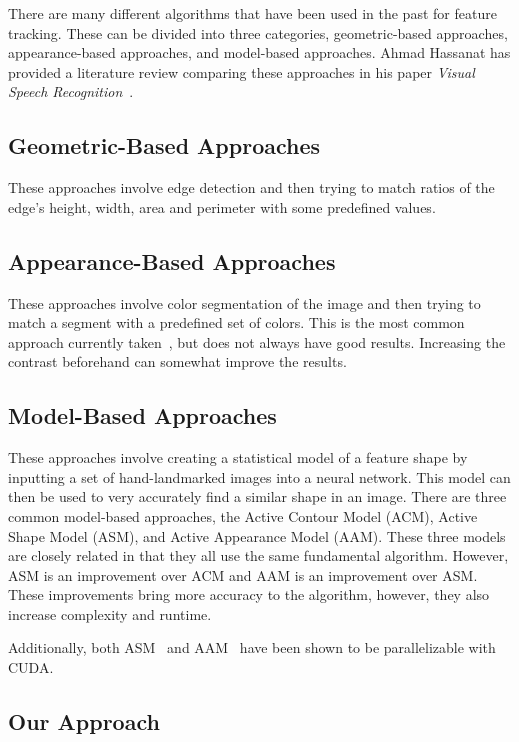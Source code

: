 There are many different algorithms that have been used in the past for feature tracking. 
These can be divided into three categories, geometric-based approaches, appearance-based approaches, and model-based approaches. Ahmad Hassanat has provided a literature review comparing these approaches in his paper \textit{Visual Speech Recognition}~\cite{Hassanat14}.

\subsection{Geometric-Based Approaches}

These approaches involve edge detection and then trying to match ratios of the edge's height, width, area and perimeter with some predefined values.

\subsection{Appearance-Based Approaches}

These approaches involve color segmentation of the image and then trying to match a segment with a predefined set of colors. 
This is the most common approach currently taken~\cite{Stillittano13}\cite{Yang09}, but does not always have good results. Increasing the contrast beforehand can somewhat improve the results.

\subsection{Model-Based Approaches}

These approaches involve creating a statistical model of a feature shape by inputting a set of hand-landmarked images into a neural network.
This model can then be used to very accurately find a similar shape in an image. 
There are three common model-based approaches, the Active Contour Model (ACM), Active Shape Model (ASM), and Active Appearance Model (AAM).
These three models are closely related in that they all use the same fundamental algorithm. However, ASM is an improvement over ACM and AAM is an improvement over ASM. These improvements bring more accuracy to the algorithm, however, they also increase complexity and runtime.

Additionally, both ASM~\cite{Li09} and AAM~\cite{Wang14} have been shown to be parallelizable with CUDA.
	

\subsection{Our Approach}

